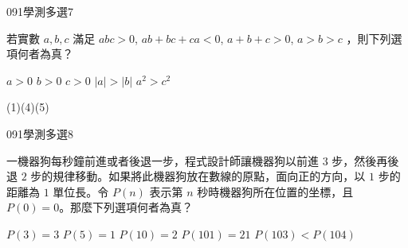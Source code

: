 \begin{QUESTIONS}
    \begin{QUESTION}
        \begin{ExamInfo}{091}{學測}{多選}{7}
        \end{ExamInfo}
        \begin{ExamAnsRateInfo}{75}{93}{82}{50}
        \end{ExamAnsRateInfo}
        \begin{QBODY}
            若實數 $a,b,c$ 滿足 $abc>0$, $ab+bc+ca<0$, $a+b+c>0$, $a>b>c$ ，則下列選項何者為真？ 
            \begin{QOPS} 
                \QOP $a>0$ 
                \QOP $b>0$ 
                \QOP $c>0$
                \QOP $|a|>|b|$ 
                \QOP $a^2>c^2$
            \end{QOPS}
        \end{QBODY}
        \begin{QFROMS}
        \end{QFROMS}
        \begin{QTAGS}\end{QTAGS}
        \begin{QANS}
            (1)(4)(5)
        \end{QANS}
        \begin{QSOLLIST}
        \end{QSOLLIST}
        \begin{QEMPTYSPACE}
        \end{QEMPTYSPACE}
    \end{QUESTION}
    \begin{QUESTION}
        \begin{ExamInfo}{091}{學測}{多選}{8}
        \end{ExamInfo}
        \begin{ExamAnsRateInfo}{60}{88}{64}{28}
        \end{ExamAnsRateInfo}
        \begin{QBODY}
            一機器狗每秒鐘前進或者後退一步，程式設計師讓機器狗以前進 $3$ 步，然後再後退 $2$ 步的規律移動。如果將此機器狗放在數線的原點，面向正的方向，以 $1$ 步的距離為 $1$ 單位長。令 $P(n)$ 表示第 $n$ 秒時機器狗所在位置的坐標，且 $P(0)=0$。那麼下列選項何者為真？ 
            \begin{QOPS}
                \QOP $P(3)=3$ 
                \QOP $P(5)=1$ 
                \QOP $P(10)=2$
                \QOP $P(101)=21$ 
                \QOP $P(103)<P(104)$
            \end{QOPS}

\end{QBODY}
\end{QUESTION}
\end{QUESTIONS}

